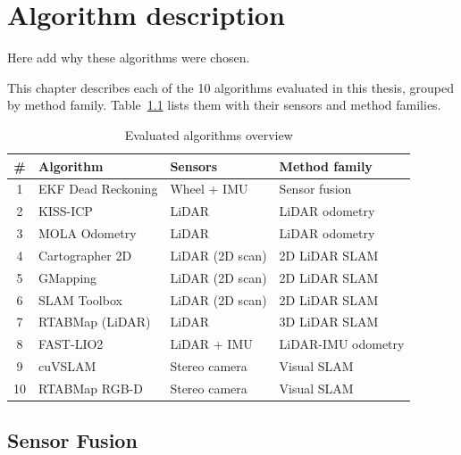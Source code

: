 \newcommand{\numalgorithms}{10}

\chapter{Algorithm description}

Here add why these algorithms were chosen.

This chapter describes each of the \numalgorithms{} algorithms evaluated in this thesis,
grouped by method family. Table~\ref{tab:algo_overview}
lists them with their sensors and method families.

\begin{table}[H]
\centering
\caption{Evaluated algorithms overview}
\label{tab:algo_overview}
\begin{tabular}{clll}
\toprule
\# & Algorithm & Sensors & Method family \\
\midrule
1  & EKF Dead Reckoning    & Wheel + IMU        & Sensor fusion \\
2  & KISS-ICP              & LiDAR              & LiDAR odometry \\
3  & MOLA Odometry         & LiDAR              & LiDAR odometry \\
4  & Cartographer 2D       & LiDAR (2D scan)    & 2D LiDAR SLAM \\
5  & GMapping              & LiDAR (2D scan)    & 2D LiDAR SLAM \\
6  & SLAM Toolbox          & LiDAR (2D scan)    & 2D LiDAR SLAM \\
7  & RTABMap (LiDAR)       & LiDAR              & 3D LiDAR SLAM \\
8  & FAST-LIO2             & LiDAR + IMU        & LiDAR-IMU odometry \\
9  & cuVSLAM               & Stereo camera      & Visual SLAM \\
10 & RTABMap RGB-D         & Stereo camera      & Visual SLAM \\
\bottomrule
\end{tabular}
\end{table}

\section{Sensor Fusion}

